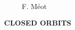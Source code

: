 \documentclass[11pt]{article}
\begin{document}
                                                                
                                                                                 
 \thispagestyle{myheadings}                                                      
                                                                                 
 ~ ~ ~                                                                           
                                                                                 
  ~ ~ ~ \hfill F. M{\'e}ot                                                       
                                                                                 
 \vspace{20mm}                                                                   
                                                                                 
 \begin{center}                                                                  
 \bf \large                                                                      
 CLOSED ORBITS                                                                   
                                                                                 
 \end{center}                                                                    
                                                                                 
                                                                                 
                                                                                 
 \tableofcontents                                                                
                                                                                 
                                                                                 
                                                                                 
                                                                                 
 
\end{document}
